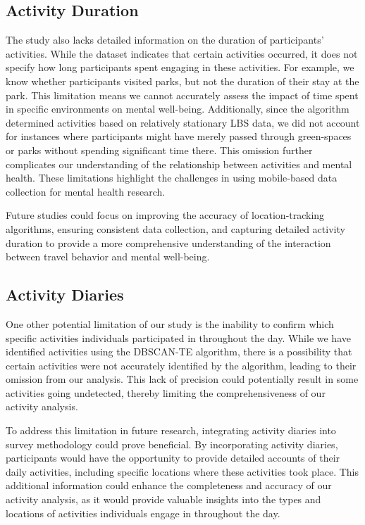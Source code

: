 \documentclass[
  letterpaper,
  number,
  review,
  3p]{elsarticle}
\begin{document}
\subsection{Activity Duration}\label{activity-duration}

The study also lacks detailed information on the duration of
participants' activities. While the dataset indicates that certain
activities occurred, it does not specify how long participants spent
engaging in these activities. For example, we know whether participants
visited parks, but not the duration of their stay at the park. This
limitation means we cannot accurately assess the impact of time spent in
specific environments on mental well-being. Additionally, since the
algorithm determined activities based on relatively stationary LBS data,
we did not account for instances where participants might have merely
passed through green-spaces or parks without spending significant time
there. This omission further complicates our understanding of the
relationship between activities and mental health. These limitations
highlight the challenges in using mobile-based data collection for
mental health research.

Future studies could focus on improving the accuracy of
location-tracking algorithms, ensuring consistent data collection, and
capturing detailed activity duration to provide a more comprehensive
understanding of the interaction between travel behavior and mental
well-being.

\subsection{Activity Diaries}\label{activity-diaries}

One other potential limitation of our study is the inability to confirm
which specific activities individuals participated in throughout the
day. While we have identified activities using the DBSCAN-TE algorithm,
there is a possibility that certain activities were not accurately
identified by the algorithm, leading to their omission from our
analysis. This lack of precision could potentially result in some
activities going undetected, thereby limiting the comprehensiveness of
our activity analysis.

To address this limitation in future research, integrating activity
diaries into survey methodology could prove beneficial. By incorporating
activity diaries, participants would have the opportunity to provide
detailed accounts of their daily activities, including specific
locations where these activities took place. This additional information
could enhance the completeness and accuracy of our activity analysis, as
it would provide valuable insights into the types and locations of
activities individuals engage in throughout the day.
\end{document}
